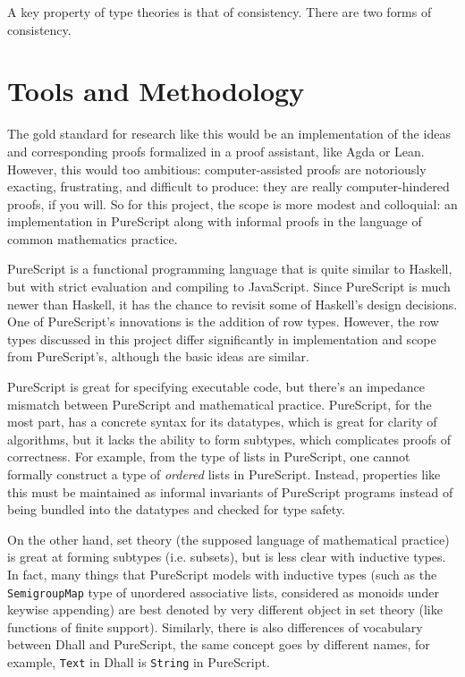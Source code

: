\documentclass[11pt, twoside, reqno]{book}
\begin{document}
A key property of type theories is that of consistency.
There are two forms of consistency.


\section{Tools and Methodology}
\label{methods}

The gold standard for research like this would be an implementation of the ideas and corresponding proofs formalized in a proof assistant, like Agda or Lean.
However, this would too ambitious: computer-assisted proofs are notoriously exacting, frustrating, and difficult to produce: they are really computer-hindered proofs, if you will.
So for this project, the scope is more modest and colloquial: an implementation in PureScript along with informal proofs in the language of common mathematics practice.

PureScript is a functional programming language that is quite similar to Haskell, but with strict evaluation and compiling to JavaScript. Since PureScript is much newer than Haskell, it has the chance to revisit some of Haskell's design decisions. One of PureScript's innovations is the addition of row types. However, the row types discussed in this project differ significantly in implementation and scope from PureScript's, although the basic ideas are similar.

PureScript is great for specifying executable code, but there's an impedance mismatch between PureScript and mathematical practice. PureScript, for the most part, has a concrete syntax for its datatypes, which is great for clarity of algorithms, but it lacks the ability to form subtypes, which complicates proofs of correctness. For example, from the type of lists in PureScript, one cannot formally construct a type of \emph{ordered} lists in PureScript. Instead, properties like this must be maintained as informal invariants of PureScript programs instead of being bundled into the datatypes and checked for type safety.

On the other hand, set theory (the supposed language of mathematical practice) is great at forming subtypes (i.e. subsets), but is less clear with inductive types. In fact, many things that PureScript models with inductive types (such as the \verb`SemigroupMap` type of unordered associative lists, considered as monoids under keywise appending) are best denoted by very different object in set theory (like functions of finite support). Similarly, there is also differences of vocabulary between Dhall and PureScript, the same concept goes by different names, for example, \verb`Text` in Dhall is \verb`String` in PureScript.
\end{document}
